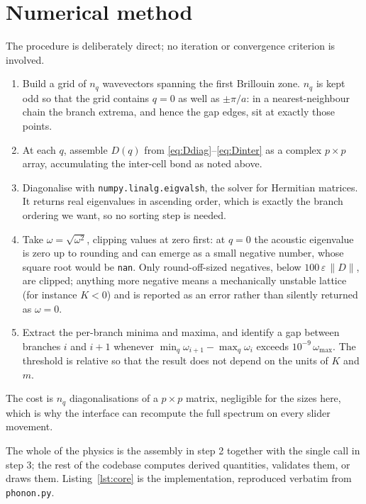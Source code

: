 \documentclass[aps,prb,reprint,nofootinbib]{revtex4-2}
\begin{document}
\section{Numerical method}

The procedure is deliberately direct; no iteration or convergence criterion is involved.

\begin{enumerate}
  \item Build a grid of $n_q$ wavevectors spanning the first Brillouin zone. $n_q$ is kept odd
        so that the grid contains $q=0$ as well as $\pm\pi/a$: in a nearest-neighbour chain the
        branch extrema, and hence the gap edges, sit at exactly those points.
  \item At each $q$, assemble $D(q)$ from \eqref{eq:Ddiag}--\eqref{eq:Dinter} as a complex
        $p \times p$ array, accumulating the inter-cell bond as noted above.
  \item Diagonalise with \texttt{numpy.linalg.eigvalsh}, the solver for Hermitian matrices. It
        returns real eigenvalues in ascending order, which is exactly the branch ordering we
        want, so no sorting step is needed.
  \item Take $\omega = \sqrt{\omega^2}$, clipping values at zero first: at $q=0$ the acoustic
        eigenvalue is zero up to rounding and can emerge as a small negative number, whose square
        root would be \texttt{nan}. Only round-off-sized negatives, below
        $100\,\varepsilon\,\lVert D\rVert$, are clipped; anything more negative means a
        mechanically unstable lattice (for instance $K<0$) and is reported as an error rather than
        silently returned as $\omega=0$.
  \item Extract the per-branch minima and maxima, and identify a gap between branches $i$ and
        $i+1$ whenever $\min_q \omega_{i+1} - \max_q \omega_i$ exceeds $10^{-9}\,\omega_{\max}$.
        The threshold is relative so that the result does not depend on the units of $K$ and
        $m$.
\end{enumerate}

The cost is $n_q$ diagonalisations of a $p \times p$ matrix, negligible for the sizes here, which
is why the interface can recompute the full spectrum on every slider movement.

The whole of the physics is the assembly in step 2 together with the single call in step 3; the
rest of the codebase computes derived quantities, validates them, or draws them.
Listing~\ref{lst:core} is the implementation, reproduced verbatim from
\texttt{phonon.py}.
\end{document}
